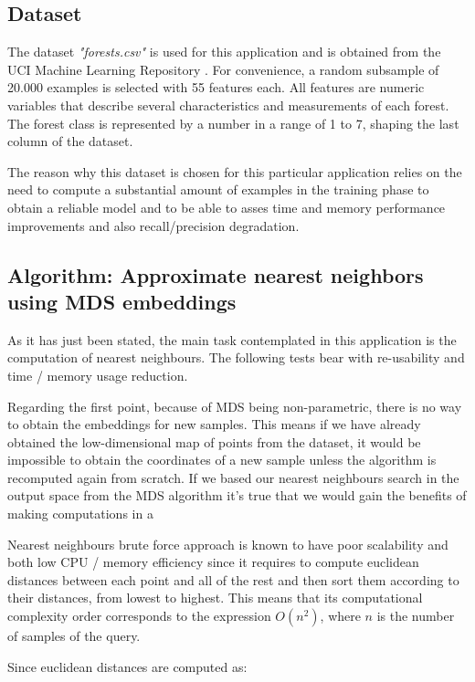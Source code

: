 \documentclass[a4paper,11pt,spanish]{report}
\begin{document}
\subsection{Dataset}
\label{ssec:data2}

The dataset \textit{"forests.csv"} is used for this application and is obtained from the UCI Machine Learning Repository \citep{ucidata}. For convenience, a random subsample of 20.000 examples is selected with 55 features each. All features are numeric variables that describe several characteristics and measurements of each forest. The forest class is represented by a number in a range of 1 to 7, shaping the last column of the dataset.

The reason why this dataset is chosen for this particular application relies on the need to compute a substantial amount of examples in the training phase to obtain a reliable model and to be able to asses time and memory performance improvements and also recall/precision degradation.

\subsection{Algorithm: Approximate nearest neighbors using MDS embeddings}
\label{ssec:nneigh}

As it has just been stated, the main task contemplated in this application is the computation of nearest neighbours. The following tests bear with re-usability and time / memory usage reduction.

Regarding the first point, because of MDS being non-parametric, there is no way to obtain the embeddings for new samples. This means if we have already obtained the low-dimensional map of points from the dataset, it would be impossible to obtain the coordinates of a new sample unless the algorithm is recomputed again from scratch. If we based our nearest neighbours search in the output space from the MDS algorithm it's true that we would gain the benefits of making computations in a 

Nearest neighbours brute force approach \citep{brute} is known to have poor scalability and both low CPU / memory efficiency since it requires to compute euclidean distances between each point and all of the rest and then sort them according to their distances, from lowest to highest. This means that its computational complexity order corresponds to the expression $O(n^{2})$, where $n$ is the number of samples of the query.

Since euclidean distances are computed as:
\end{document}
